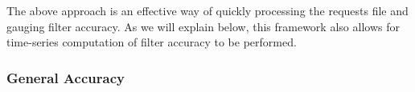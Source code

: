 \documentclass{bmcart}
\begin{document}
The above approach is an effective way of quickly processing the requests file and gauging filter accuracy.
As we will explain below, this framework also allows for time-series computation of filter accuracy to be performed.


\subsubsection*{General Accuracy}

%
\end{document}
